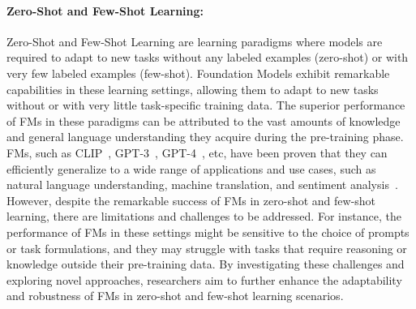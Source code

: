 \paragraph{Zero-Shot and Few-Shot Learning:} 
Zero-Shot and Few-Shot Learning are learning paradigms where models are required to adapt to new tasks without any labeled examples (zero-shot) or with very few labeled examples (few-shot). Foundation Models exhibit remarkable capabilities in these learning settings, allowing them to adapt to new tasks without or with very little task-specific training data. The superior performance of FMs in these paradigms can be attributed to the vast amounts of knowledge and general language understanding they acquire during the pre-training phase. FMs, such as CLIP~\cite{}, GPT-3~\cite{}, GPT-4~\cite{}, etc, have been proven that they can efficiently generalize to a wide range of applications and use cases, such as natural language understanding, machine translation, and sentiment analysis~\cite{}.
However, despite the remarkable success of FMs in zero-shot and few-shot learning, there are limitations and challenges to be addressed. For instance, the performance of FMs in these settings might be sensitive to the choice of prompts or task formulations, and they may struggle with tasks that require reasoning or knowledge outside their pre-training data. By investigating these challenges and exploring novel approaches, researchers aim to further enhance the adaptability and robustness of FMs in zero-shot and few-shot learning scenarios.







